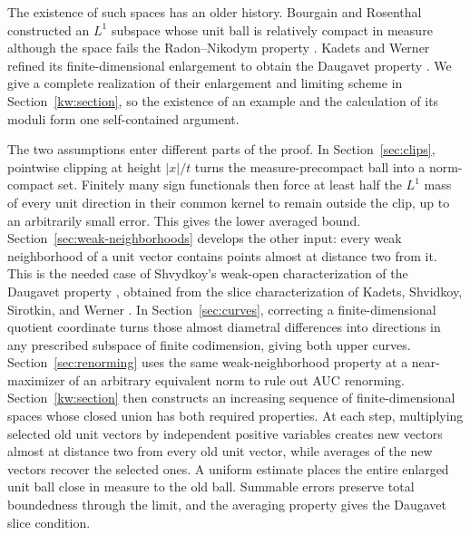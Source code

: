 The existence of such spaces has an older history.  Bourgain and
Rosenthal constructed an $L^1$ subspace whose unit ball is relatively
compact in measure although the space fails the Radon--Nikodym property
\cite{BourgainRosenthal1980}.  Kadets and Werner refined its
finite-dimensional enlargement to obtain the Daugavet property
\cite[Lemma~2.4 and Theorem~2.5]{KW2004}. We give a complete realization of
their enlargement and limiting scheme in Section~\ref{kw:section}, so
the existence of an example and the calculation of its moduli form one
self-contained argument.

The two assumptions enter different parts of the proof.
In Section~\ref{sec:clips}, pointwise clipping at height $|x|/t$ turns the
measure-precompact ball into a norm-compact set.  Finitely many sign
functionals then force at least half the $L^1$ mass of every unit
direction in their common kernel to remain outside the clip, up to an
arbitrarily small error. This gives the lower
averaged bound.  Section~\ref{sec:weak-neighborhoods} develops the other
input: every weak neighborhood of a unit vector contains points almost
at distance two from it.  This is the needed case of Shvydkoy's
weak-open characterization of the Daugavet property
\cite[Lemma~3]{Shvydkoy2000}, obtained from the slice characterization
of Kadets, Shvidkoy, Sirotkin, and Werner \cite[Lemma~2.2]{KSSW2000}.
In Section~\ref{sec:curves}, correcting a finite-dimensional quotient
coordinate turns those almost diametral differences into directions in
any prescribed subspace of finite codimension, giving both upper curves.
Section~\ref{sec:renorming} uses the same weak-neighborhood
property at a near-maximizer of an arbitrary equivalent norm to rule
out AUC renorming. Section~\ref{kw:section} then constructs an increasing
sequence of finite-dimensional spaces whose closed union has both
required properties. At each step, multiplying selected old unit
vectors by independent positive variables creates new vectors almost
at distance two from every old unit vector, while averages of the new
vectors recover the selected ones. A uniform estimate places the
entire enlarged unit ball close in measure to the old ball. Summable
errors preserve total boundedness through the limit, and the averaging
property gives the Daugavet slice condition.
